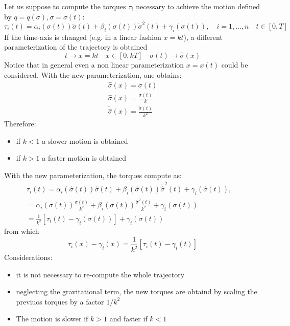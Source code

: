 \documentclass{book}
\begin{document}
Let us suppose to compute the torques $\tau_i$ necessary to achieve the motion defined by $q=q(\sigma),\sigma=\sigma(t)$: 
\[
    \tau_i(t)=\alpha_i(\sigma(t))\ddot{\sigma}(t)+\beta_i(\sigma(t))\dot{\sigma}^2(t)+\gamma_i(\sigma(t)),\quad i=1,\dots,n \quad t \in [0,T]
\]
If the time-axis is changed (e.g. in a linear fashion $x=kt$), a different parameterization of the trajectory is obtained 
\[
    t\to x=kt \quad x\in[0,kT] \quad \sigma(t)\to\hat{\sigma}(x)
\]
Notice that in general even a non linear parameterization $x=x(t)$ could be considered. With the new  parameterization, one obtains: 
\begin{gather*}
    \hat{\sigma}(x)=\sigma(t)\\
    \dot{\hat{\sigma}}(x)=\displaystyle\frac{\dot{\sigma}(t)}{k}\\
    \ddot{\hat{\sigma}}(x)=\displaystyle\frac{\ddot{\sigma}(t)}{k^2}
\end{gather*}
Therefore: 
\begin{itemize}
    \item if $k<1$ a slower motion is obtained 
    \item if $k>1$ a faster motion is obtained
\end{itemize}
With the new parameterization, the torques compute as: 
\begin{gather*}
    \tau_i(t)=\alpha_i(\hat{\sigma}(t))\ddot{\hat{\sigma}}(t)+\beta_i(\hat{\sigma}(t))\dot{\hat{\sigma}}^2(t)+\gamma_i(\hat{\sigma}(t)),\quad \\
    = \alpha_i(\sigma(t))\displaystyle\frac{\ddot{\sigma(t)}}{k^2}+\beta_i(\sigma(t))\displaystyle\frac{\dot{\sigma}^2(t)}{k^2}+\gamma_i(\sigma(t))\\
    = \displaystyle\frac{1}{k^2}[\tau_i(t)-\gamma_i(\sigma(t))]+\gamma_i(\sigma(t))
\end{gather*}
from which
\[
    \tau_i(x)-\gamma_i(x)=\displaystyle\frac{1}{k^2}[\tau_i(t)-\gamma_i(t)]
\]
Considerations: 
\begin{itemize}
    \item it is not necessary to re-compute the whole trajectory 
        \item neglecting the gravitational term, the new torques are obtaind by scaling the previuos torques by a factor $1/k^2$
            \item The motion is slower if $k>1$ and faster if $k<1$
\end{itemize}
\end{document}
